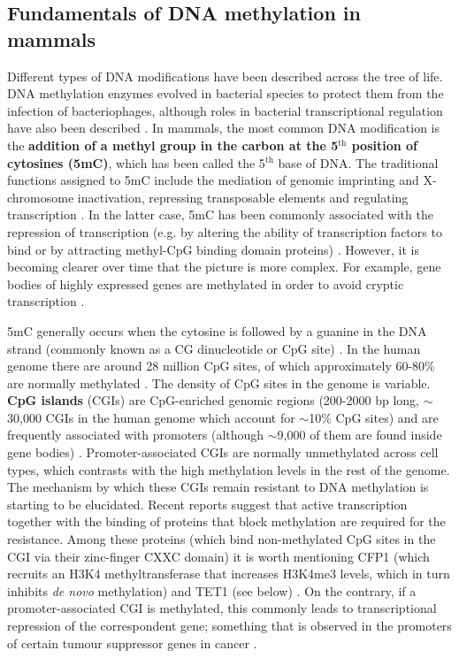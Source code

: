 \smallskip

\subsection{Fundamentals of DNA methylation in mammals} \label{s:1.2.2}

\smallskip

Different types of DNA modifications have been described across the tree of life. DNA methylation enzymes evolved in bacterial species to protect them from the infection of bacteriophages, although roles in bacterial transcriptional regulation have also been described  \citep{Sanchez-Romero2015}. In mammals, the most common DNA modification is the \textbf{addition of a methyl group in the carbon at the 5$^{\text{th}}$ position of cytosines (\acrshort{5mC})}, which has been called the 5$^{\text{th}}$ base of DNA. The traditional functions assigned to 5mC include the mediation of genomic imprinting and X-chromosome inactivation, repressing transposable elements and regulating transcription \citep{Wu2017}. In the latter case, 5mC has been commonly associated with the repression of transcription (e.g. by altering the ability of transcription factors to bind or by attracting methyl-CpG binding domain proteins) \citep{Li2014}. However, it is becoming clearer over time that the picture is more complex. For example, gene bodies of highly expressed genes are methylated in order to avoid cryptic transcription \citep{Neri2017}.

\bigskip

5mC generally occurs when the cytosine is followed by a guanine in the DNA strand (commonly known as a CG dinucleotide or CpG site) \citep{Li2014,Smith2013}. In the human genome there are around 28 million CpG sites, of which approximately 60-80\% are normally methylated \citep{Smith2013}. The density of CpG sites in the genome is variable. \textbf{CpG islands} (\acrshort{CGI}s) are CpG-enriched genomic regions (200-2000 bp long, $\sim$30,000 CGIs in the human genome which account for $\sim$10\% CpG sites) and are frequently associated with promoters (although $\sim$9,000 of them are found inside gene bodies) \citep{Smith2013,Jeziorska2017,Zeng2014}. Promoter-associated CGIs are normally unmethylated across cell types, which contrasts with the high methylation levels in the rest of the genome. The mechanism by which these CGIs remain resistant to DNA methylation is starting to be elucidated. Recent reports suggest that active transcription together with the binding of proteins that block methylation are required for the resistance. Among these proteins (which bind non-methylated CpG sites in the CGI via their zinc-finger CXXC domain) it is worth mentioning CFP1 (which recruits an H3K4 methyltransferase that increases H3K4me3 levels, which in turn inhibits \textit{de novo} methylation) and TET1 (see below) \citep{Takahashi2017}. On the contrary, if a promoter-associated CGI is methylated, this commonly leads to transcriptional repression of the correspondent gene; something that is observed in the promoters of certain tumour suppressor genes in cancer \citep{Flavahan2017}. 

